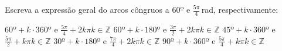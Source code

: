 Escreva a expressão geral do arcos côngruos a $60º$ e $\frac{5\pi}{4}$\,rad, respectivamente:

$60º+k\cdot 360º$ e $\frac{5\pi}{4}+2k\pi$\quad $k\in\mathbb{Z}$
$60º+k\cdot 180º$ e $\frac{3\pi}{2}+2k\pi$\quad $k\in\mathbb{Z}$
$45º+k\cdot 360º$ e $\frac{5\pi}{2}+k\pi$\quad $k\in\mathbb{Z}$
$30º+k\cdot 180º$ e $\frac{7\pi}{4}+2k\pi$\quad $k\in\mathbb{Z}$
$90º+k\cdot 360º$ e $\frac{5\pi}{4}+k\pi$\quad $k\in\mathbb{Z}$


